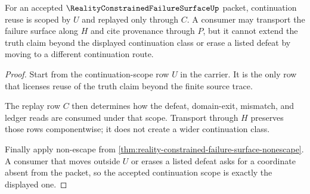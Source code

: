 \begin{theorem}
\label{thm:reality-constrained-failure-surface-continuation-scope}
For an accepted $\RealityConstrainedFailureSurfaceUp$ packet, continuation reuse is scoped by $U$ and replayed only through $C$. A consumer may transport the failure surface along $H$ and cite provenance through $P$, but it cannot extend the truth claim beyond the displayed continuation class or erase a listed defeat by moving to a different continuation route.
\end{theorem}
\begin{proof}
Start from the continuation-scope row $U$ in the carrier. It is the only row that licenses reuse of the truth claim beyond the finite source trace.

The replay row $C$ then determines how the defeat, domain-exit, mismatch, and ledger reads are consumed under that scope. Transport through $H$ preserves those rows componentwise; it does not create a wider continuation class.

Finally apply non-escape from \autoref{thm:reality-constrained-failure-surface-nonescape}. A consumer that moves outside $U$ or erases a listed defeat asks for a coordinate absent from the packet, so the accepted continuation scope is exactly the displayed one.
\end{proof}

